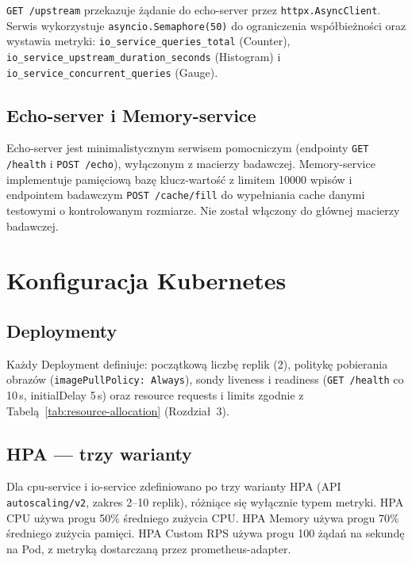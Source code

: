 

\texttt{GET /upstream} przekazuje żądanie do echo-server przez \texttt{httpx.AsyncClient}. Serwis wykorzystuje \texttt{asyncio.Semaphore(50)} do ograniczenia współbieżności oraz wystawia metryki: \texttt{io\_service\_queries\_total} (Counter), \texttt{io\_service\_upstream\_duration\_seconds} (Histogram) i \texttt{io\_service\_concurrent\_queries} (Gauge).

\subsection{Echo-server i Memory-service}

Echo-server jest minimalistycznym serwisem pomocniczym (endpointy \texttt{GET /health} i \texttt{POST /echo}), wyłączonym z macierzy badawczej. Memory-service implementuje pamięciową bazę klucz-wartość z limitem 10000 wpisów i endpointem badawczym \texttt{POST /cache/fill} do wypełniania cache danymi testowymi o kontrolowanym rozmiarze. Nie został włączony do głównej macierzy badawczej.

\section{Konfiguracja Kubernetes}

\subsection{Deploymenty}

Każdy Deployment definiuje: początkową liczbę replik (2), politykę pobierania obrazów (\texttt{imagePullPolicy: Always}), sondy liveness i readiness (\texttt{GET /health} co 10\,s, initialDelay 5\,s) oraz resource requests i limits zgodnie z Tabelą~\ref{tab:resource-allocation} (Rozdział~3).



\subsection{HPA --- trzy warianty}

Dla cpu-service i io-service zdefiniowano po trzy warianty HPA (API \texttt{autoscaling/v2}, zakres 2--10 replik), różniące się wyłącznie typem metryki. HPA CPU używa progu 50\% średniego zużycia CPU. HPA Memory używa progu 70\% średniego zużycia pamięci. HPA Custom RPS używa progu 100 żądań na sekundę na Pod, z metryką dostarczaną przez prometheus-adapter.

